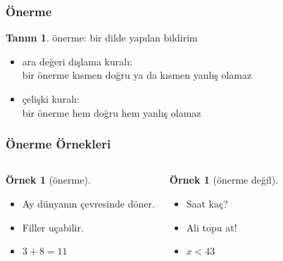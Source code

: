 \documentclass[dvipsnames]{beamer}
\theoremstyle{definition}
\newtheorem{tanim}[theorem]{Tanım}
\theoremstyle{example}
\newtheorem{ornek}[theorem]{Örnek}
\theoremstyle{plain}
\begin{document}
\begin{frame}
  \frametitle{Önerme}

  \begin{tanim}
    \alert{önerme}: bir dilde yapılan bildirim
  \end{tanim}

  \pause
  \begin{itemize}
    \item \alert{ara değeri dışlama kuralı}:\\
      bir önerme kısmen doğru ya da kısmen yanlış olamaz
  \end{itemize}

  \pause
  \begin{itemize}
    \item \alert{çelişki kuralı}:\\
      bir önerme hem doğru hem yanlış olamaz
  \end{itemize}
\end{frame}

\begin{frame}
  \frametitle{Önerme Örnekleri}

  \begin{columns}[t]
    \begin{ornek}[önerme]
      \begin{itemize}
        \item Ay dünyanın çevresinde döner.
        \item Filler uçabilir.
        \item $3+8=11$
      \end{itemize}
    \end{ornek}

    \pause
    \begin{ornek}[önerme değil]
      \begin{itemize}
        \item Saat kaç?
        \item Ali topu at!
        \item $x<43$
      \end{itemize}
    \end{ornek}
  \end{columns}
\end{frame}
\end{document}
